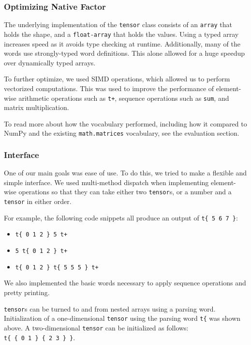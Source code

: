 \documentclass[
]{article}
\begin{document}
\hypertarget{optimizing-native-factor}{%
\subsubsection{Optimizing Native
Factor}\label{optimizing-native-factor}}

The underlying implementation of the \texttt{tensor} class consists of
an \texttt{array} that holds the shape, and a \texttt{float-array} that
holds the values. Using a typed array increases speed as it avoids type
checking at runtime. Additionally, many of the words use strongly-typed
word definitions. This alone allowed for a huge speedup over dynamically
typed arrays.

To further optimize, we used SIMD operations, which allowed us to
perform vectorized computations. This was used to improve the
performance of element-wise arithmetic operations such as \texttt{t+},
sequence operations such as \texttt{sum}, and matrix multiplication.

To read more about how the vocabulary performed, including how it
compared to NumPy and the existing \texttt{math.matrices} vocabulary,
see the evaluation section.

\hypertarget{interface}{%
\subsubsection{Interface}\label{interface}}

One of our main goals was ease of use. To do this, we tried to make a
flexible and simple interface. We used multi-method dispatch when
implementing element-wise operations so that they can take either two
\texttt{tensor}s, or a number and a \texttt{tensor} in either order.

For example, the following code snippets all produce an output of
\texttt{t\{\ 5\ 6\ 7\ \}}:
\begin{itemize}
\item \texttt{t\{\ 0\ 1\ 2\ \}\ 5\ t+}
\item \texttt{5\ t\{\ 0\ 1\ 2\ \}\ t+}
\item \texttt{t\{\ 0\ 1\ 2\ \}\ t\{\ 5\ 5\ 5\ \}\ t+}
\end{itemize}

We also implemented the basic words necessary to apply sequence
operations and pretty printing.

\texttt{tensor}s can be turned to and from nested arrays using a parsing
word. Initialization of a one-dimensional \texttt{tensor} using the
parsing word \texttt{t\{} was shown above. A two-dimensional
\texttt{tensor} can be initialized as follows:
\texttt{t\{\ \{\ 0\ 1\ \}\ \{\ 2\ 3\ \}\ \}}.
\end{document}
